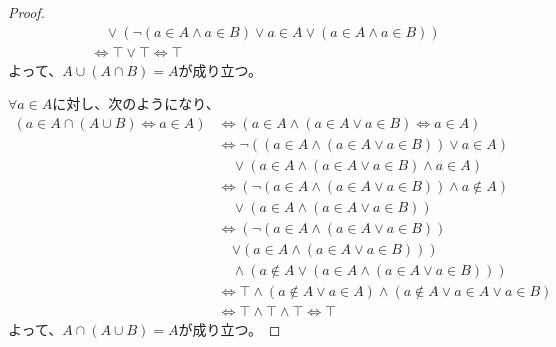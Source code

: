 \documentclass[a4paper]{jsarticle}
\begin{document}
\begin{proof}
\begin{align*}
&\quad \vee \left( \neg(a \in A \land a \in B) \vee a \in A \vee (a \in A \land a \in B) \right)\\
&\Leftrightarrow \top \vee \top \Leftrightarrow \top
\end{align*}
よって、$A \cup (A \cap B) = A$が成り立つ。\par
$\forall a \in A$に対し、次のようになり、
\begin{align*}
\left( a \in A \cap (A \cup B) \Leftrightarrow a \in A \right) &\Leftrightarrow \left( a \in A \land (a \in A \vee a \in B) \Leftrightarrow a \in A \right)\\
&\Leftrightarrow \neg\left( \left( a \in A \land (a \in A \vee a \in B) \right) \vee a \in A \right) \\
&\quad \vee \left( a \in A \land (a \in A \vee a \in B) \land a \in A \right)\\
&\Leftrightarrow \left( \neg\left( a \in A \land (a \in A \vee a \in B) \right) \land a \notin A \right) \\
&\quad \vee \left( a \in A \land (a \in A \vee a \in B) \right)\\
&\Leftrightarrow \left( \neg\left( a \in A \land (a \in A \vee a \in B) \right) \right. \\
&\quad \left. \vee \left( a \in A \land (a \in A \vee a \in B) \right) \right) \\
&\quad \land \left( a \notin A \vee \left( a \in A \land (a \in A \vee a \in B) \right) \right)\\
&\Leftrightarrow \top \land (a \notin A \vee a \in A) \land (a \notin A \vee a \in A \vee a \in B)\\
&\Leftrightarrow \top \land \top \land \top \Leftrightarrow \top
\end{align*}
よって、$A \cap (A \cup B) = A$が成り立つ。
\end{proof}
\end{document}
